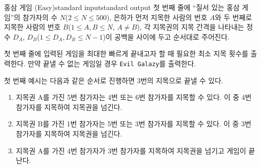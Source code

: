 \begin{problem}{홍삼 게임 (Easy)}{standard input}{standard output}
\InputFile
첫 번째 줄에 ``질서 있는 홍삼 게임''의 참가자의 수 $N$($2 \le N \le 500$), 은하가 먼저 지목한 사람의 번호 $A$와 두 번째로 지목한 사람의 번호 $B$($1 \le A, B \le N$, $A \neq B$), 각 지목권의 지목 간격을 나타내는 정수 $D_{A}$, $D_{B}$($1 \le D_{A}, D_{B} \le N-1$)이 공백을 사이에 두고 순서대로 주어진다.

\OutputFile
첫 번째 줄에 입력된 게임을 최대한 빠르게 끝내고자 할 때 필요한 최소 지목 횟수를 출력한다. 만약 끝낼 수 없는 게임일 경우 \texttt{Evil Galazy}를 출력한다.

\Example

\begin{example}
%
%
\end{example}

\Notes

첫 번째 예시는 다음과 같은 순서로 진행하면 3번의 지목으로 끝낼 수 있다.

\begin{enumerate}
\item{지목권 A를 가진 5번 참가자는 4번 또는 6번 참가자를 지목할 수 있다. 이 중 4번 참가자를 지목하여 지목권을 넘긴다.}
\item{지목권 B를 가진 1번 참가자는 5번 또는 3번 참가자를 지목할 수 있다. 이 중 3번 참가자를 지목하여 지목권을 넘긴다.}
\item{지목권 A를 가진 4번 참가자가 3번 참가자를 지목하여 지목권을 넘기고 게임이 끝난다.}
\end{enumerate}

\end{problem}
